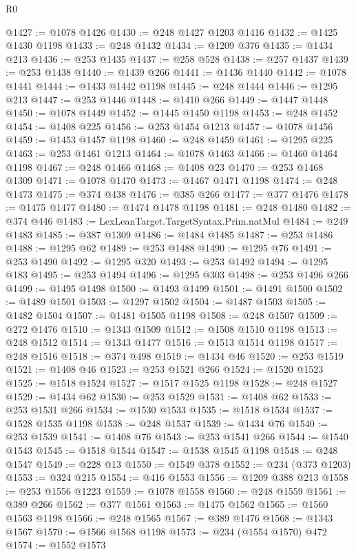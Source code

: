 \begin{lexlean}{R0}
\begin{coremodule}
@1427 := @1078 @1426
@1430 := @248 @1427 @1203 @1416
@1432 := @1425 @1430 @1198
@1433 := @248 @1432
@1434 := @1209 @376
@1435 := @1434 @213
@1436 := @253 @1435
@1437 := @258 @528
@1438 := @257 @1437
@1439 := @253 @1438
@1440 := @1439 @266
@1441 := @1436 @1440
@1442 := @1078 @1441
@1444 := @1433 @1442 @1198
@1445 := @248 @1444
@1446 := @1295 @213
@1447 := @253 @1446
@1448 := @1410 @266
@1449 := @1447 @1448
@1450 := @1078 @1449
@1452 := @1445 @1450 @1198
@1453 := @248 @1452
@1454 := @1408 @225
@1456 := @253 @1454 @1213
@1457 := @1078 @1456
@1459 := @1453 @1457 @1198
@1460 := @248 @1459
@1461 := @1295 @225
@1463 := @253 @1461 @1213
@1464 := @1078 @1463
@1466 := @1460 @1464 @1198
@1467 := @248 @1466
@1468 := @1408 @23
@1470 := @253 @1468 @1309
@1471 := @1078 @1470
@1473 := @1467 @1471 @1198
@1474 := @248 @1473
@1475 := @374 @438
@1476 := @385 @266
@1477 := @377 @1476
@1478 := @1475 @1477
@1480 := @1474 @1478 @1198
@1481 := @248 @1480
@1482 := @374 @446
@1483 := LexLeanTarget.TargetSyntax.Prim.natMul
@1484 := @249 @1483
@1485 := @387 @1309
@1486 := @1484 @1485
@1487 := @253 @1486
@1488 := @1295 @62
@1489 := @253 @1488
@1490 := @1295 @76
@1491 := @253 @1490
@1492 := @1295 @320
@1493 := @253 @1492
@1494 := @1295 @183
@1495 := @253 @1494
@1496 := @1295 @303
@1498 := @253 @1496 @266
@1499 := @1495 @1498
@1500 := @1493 @1499
@1501 := @1491 @1500
@1502 := @1489 @1501
@1503 := @1297 @1502
@1504 := @1487 @1503
@1505 := @1482 @1504
@1507 := @1481 @1505 @1198
@1508 := @248 @1507
@1509 := @272 @1476
@1510 := @1343 @1509
@1512 := @1508 @1510 @1198
@1513 := @248 @1512
@1514 := @1343 @1477
@1516 := @1513 @1514 @1198
@1517 := @248 @1516
@1518 := @374 @498
@1519 := @1434 @46
@1520 := @253 @1519
@1521 := @1408 @46
@1523 := @253 @1521 @266
@1524 := @1520 @1523
@1525 := @1518 @1524
@1527 := @1517 @1525 @1198
@1528 := @248 @1527
@1529 := @1434 @62
@1530 := @253 @1529
@1531 := @1408 @62
@1533 := @253 @1531 @266
@1534 := @1530 @1533
@1535 := @1518 @1534
@1537 := @1528 @1535 @1198
@1538 := @248 @1537
@1539 := @1434 @76
@1540 := @253 @1539
@1541 := @1408 @76
@1543 := @253 @1541 @266
@1544 := @1540 @1543
@1545 := @1518 @1544
@1547 := @1538 @1545 @1198
@1548 := @248 @1547
@1549 := @228 @13
@1550 := @1549 @378
@1552 := @234 (@373 @1203)
@1553 := @324 @215
@1554 := @416 @1553
@1556 := @1209 @388 @213
@1558 := @253 @1556 @1223
@1559 := @1078 @1558
@1560 := @248 @1559
@1561 := @389 @266
@1562 := @377 @1561
@1563 := @1475 @1562
@1565 := @1560 @1563 @1198
@1566 := @248 @1565
@1567 := @389 @1476
@1568 := @1343 @1567
@1570 := @1566 @1568 @1198
@1573 := @234 (@1554 @1570) @472
@1574 := @1552 @1573

\end{coremodule}
\end{lexlean}
